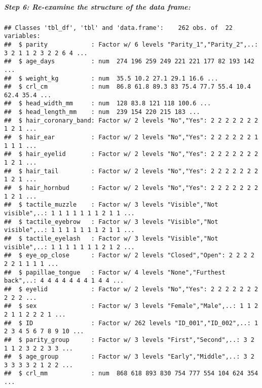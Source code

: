\documentclass[
]{article}
\newenvironment{Shaded}{\begin{snugshade}}{\end{snugshade}}
\newcommand{\KeywordTok}[1]{\textcolor[rgb]{0.13,0.29,0.53}{\textbf{#1}}}
\newcommand{\NormalTok}[1]{#1}
\newcommand{\OperatorTok}[1]{\textcolor[rgb]{0.81,0.36,0.00}{\textbf{#1}}}
\newcommand{\StringTok}[1]{\textcolor[rgb]{0.31,0.60,0.02}{#1}}
\begin{document}
\hypertarget{step-6-re-examine-the-structure-of-the-data-frame}{%
\subparagraph{Step 6: Re-examine the structure of the data
frame:}\label{step-6-re-examine-the-structure-of-the-data-frame}}

\begin{Shaded}
\end{Shaded}

\begin{verbatim}
## Classes 'tbl_df', 'tbl' and 'data.frame':    262 obs. of  22 variables:
##  $ parity            : Factor w/ 6 levels "Parity_1","Parity_2",..: 3 2 1 1 2 3 2 2 6 4 ...
##  $ age_days          : num  274 196 259 249 221 221 177 82 193 142 ...
##  $ weight_kg         : num  35.5 10.2 27.1 29.1 16.6 ...
##  $ crl_cm            : num  86.8 61.8 89.3 83 75.4 77.7 55.4 10.4 62.4 35.4 ...
##  $ head_width_mm     : num  128 83.8 121 118 100.6 ...
##  $ head_length_mm    : num  239 154 220 215 183 ...
##  $ hair_coronary_band: Factor w/ 2 levels "No","Yes": 2 2 2 2 2 2 2 1 2 1 ...
##  $ hair_ear          : Factor w/ 2 levels "No","Yes": 2 2 2 2 2 2 1 1 1 1 ...
##  $ hair_eyelid       : Factor w/ 2 levels "No","Yes": 2 2 2 2 2 2 2 1 2 1 ...
##  $ hair_tail         : Factor w/ 2 levels "No","Yes": 2 2 2 2 2 2 2 1 2 1 ...
##  $ hair_hornbud      : Factor w/ 2 levels "No","Yes": 2 2 2 2 2 2 2 1 2 1 ...
##  $ tactile_muzzle    : Factor w/ 3 levels "Visible","Not visible",..: 1 1 1 1 1 1 1 2 1 1 ...
##  $ tactile_eyebrow   : Factor w/ 3 levels "Visible","Not visible",..: 1 1 1 1 1 1 1 2 1 1 ...
##  $ tactile_eyelash   : Factor w/ 3 levels "Visible","Not visible",..: 1 1 1 1 1 1 1 2 1 2 ...
##  $ eye_op_close      : Factor w/ 2 levels "Closed","Open": 2 2 2 2 2 2 1 1 1 1 ...
##  $ papillae_tongue   : Factor w/ 4 levels "None","Furthest back",..: 4 4 4 4 4 4 4 1 4 4 ...
##  $ eyelid            : Factor w/ 2 levels "No","Yes": 2 2 2 2 2 2 2 2 2 2 ...
##  $ sex               : Factor w/ 3 levels "Female","Male",..: 1 1 2 2 1 1 2 2 2 1 ...
##  $ ID                : Factor w/ 262 levels "ID_001","ID_002",..: 1 2 3 4 5 6 7 8 9 10 ...
##  $ parity_group      : Factor w/ 3 levels "First","Second",..: 3 2 1 1 2 3 2 2 3 3 ...
##  $ age_group         : Factor w/ 3 levels "Early","Middle",..: 3 2 3 3 3 3 2 1 2 2 ...
##  $ crl_mm            : num  868 618 893 830 754 777 554 104 624 354 ...
\end{verbatim}
\end{document}
